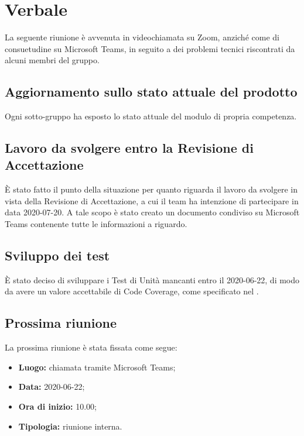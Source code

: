 \section{Verbale}
La seguente riunione è avvenuta in videochiamata su Zoom, anziché come di consuetudine su Microsoft Teams, in seguito a dei problemi tecnici riscontrati da alcuni membri del gruppo. 

	\subsection{Aggiornamento sullo stato attuale del prodotto}
		Ogni sotto-gruppo ha esposto lo stato attuale del modulo\textit{} di propria competenza.
		
	\subsection{Lavoro da svolgere entro la Revisione di Accettazione}
		È stato fatto il punto della situazione per quanto riguarda il lavoro da svolgere in vista della Revisione di Accettazione, a cui il team ha intenzione di partecipare in data 2020-07-20. A tale scopo è stato creato un documento condiviso su Microsoft Teams contenente tutte le informazioni a riguardo.
		
	\subsection{Sviluppo dei test}
		È stato deciso di sviluppare i Test di Unità mancanti entro il 2020-06-22, di modo da avere un valore accettabile di Code Coverage, come specificato nel \PdQ.
				
	\subsection{Prossima riunione}
		La prossima riunione è stata fissata come segue:
		\begin{itemize}
			\item \textbf{Luogo:} chiamata tramite Microsoft Teams; 
			\item \textbf{Data:} 2020-06-22;
			\item \textbf{Ora di inizio:} 10.00;
			\item \textbf{Tipologia:} riunione interna.
		\end{itemize}